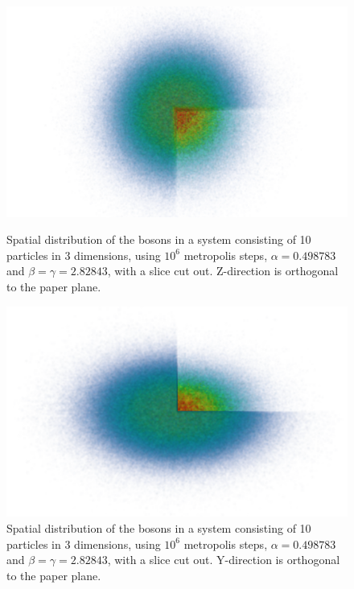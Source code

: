 \documentclass[english, a4paper]{article}
\begin{document}
\begin{figure}[H]
\begin{minipage}[t]{0.48\linewidth}
  \includegraphics[width=\textwidth]{../modifiedMortenCode/figures/spatialDistributione8.png}
  \caption{Spatial distribution of the bosons in a system consisting of 10 particles in 3 dimensions, using $10^6$ metropolis steps,  $\alpha=0.498783$ and $\beta = \gamma = 2.82843$, with a slice cut out. Z-direction is orthogonal to the paper plane. }
  \label{fig:spatialDistribution}
\end{minipage}
\quad
\begin{minipage}[t]{0.48\linewidth}
\includegraphics[width=\textwidth]{../modifiedMortenCode/figures/spatialDistributione8yz.png}
  \caption{Spatial distribution of the bosons in a system consisting of 10 particles in 3 dimensions, using $10^6$ metropolis steps,  $\alpha=0.498783$ and $\beta = \gamma = 2.82843$, with a slice cut out. Y-direction is orthogonal to the paper plane.}
  \label{fig:spatialDistribution2}
\end{minipage}
\end{figure}
\end{document}
